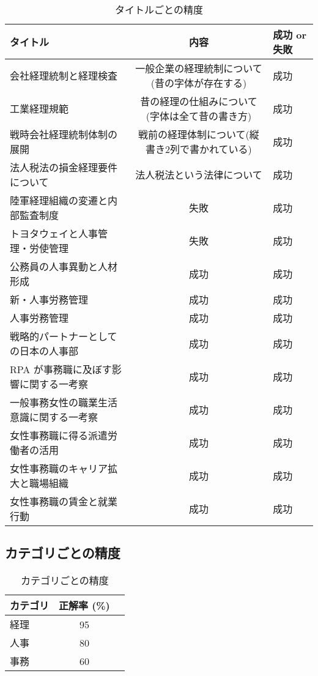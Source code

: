 \begin{table}[h]
  \centering
  \begin{tabular}{|l|c|l|}
    \hline
    \textbf{タイトル} & \textbf{内容} & \textbf{成功 or 失敗} \\ \hline
    会社経理統制と経理検査 & 一般企業の経理統制について(昔の字体が存在する) & 成功 \\ \hline
    工業経理規範 & 昔の経理の仕組みについて(字体は全て昔の書き方) & 成功 \\ \hline
    戦時会社経理統制体制の展開 & 戦前の経理体制について(縦書き2列で書かれている) & 成功 \\ \hline
    法人税法の損金経理要件について & 法人税法という法律について & 成功 \\ \hline
    陸軍経理組織の変遷と内部監査制度 & 失敗 & 成功 \\ \hline
    トヨタウェイと人事管理・労使管理 & 失敗 & 成功 \\ \hline
    公務員の人事異動と人材形成 & 成功 & 成功 \\ \hline
    新・人事労務管理 & 成功 & 成功 \\ \hline
    人事労務管理 & 成功 & 成功 \\ \hline
    戦略的パートナーとしての日本の人事部 & 成功 & 成功 \\ \hline
    RPA が事務職に及ぼす影響に関する一考察 & 成功 & 成功 \\ \hline
    一般事務女性の職業生活意識に関する一考察 & 成功 & 成功 \\ \hline
    女性事務職に得る派遣労働者の活用 & 成功 & 成功 \\ \hline
    女性事務職のキャリア拡大と職場組織 & 成功 & 成功 \\ \hline
    女性事務職の賃金と就業行動 & 成功 & 成功 \\ \hline
  \end{tabular}
  \caption{タイトルごとの精度}
\end{table}

\subsection{カテゴリごとの精度}
\label{subsec:category}

\begin{table}[h]
  \centering
  \begin{tabular}{|l|c|l|}
    \hline
    \textbf{カテゴリ} & \textbf{正解率 (\%)} \\ \hline
    経理 & 95 \\ \hline
    人事 & 80 \\ \hline
    事務 & 60 \\ \hline
  \end{tabular}
  \caption{カテゴリごとの精度}
\end{table}
